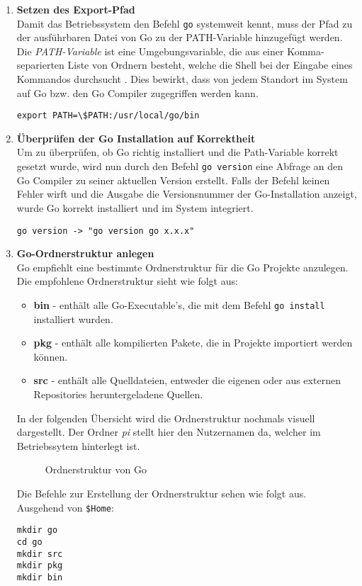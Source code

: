 \begin{enumerate}
\item \textbf{Setzen des Export-Pfad} \\
Damit das Betriebssystem den Befehl \verb|go| systemweit kennt, muss der Pfad zu der
ausführbaren Datei von Go zu der PATH-Variable hinzugefügt werden. Die
\textit{PATH-Variable} ist eine Umgebungsvariable, die aus einer
Komma-separierten Liste von Ordnern besteht, welche die Shell bei der Eingabe
eines Kommandos durchsucht \autocite{quigley_2000}. Dies bewirkt, dass von
jedem Standort im System auf Go bzw. den Go Compiler zugegriffen werden kann.
\begin{lstlisting}[caption={Setzen der Go-Path Variable}]
export PATH=\$PATH:/usr/local/go/bin
\end{lstlisting}

\item \textbf{Überprüfen der Go Installation auf Korrektheit} \\
Um zu überprüfen, ob Go richtig installiert und die Path-Variable
korrekt gesetzt wurde, wird nun durch den Befehl \verb|go version|
eine Abfrage an den Go Compiler zu seiner aktuellen Version erstellt. Falls der
Befehl keinen Fehler wirft und die Ausgabe die Versionsnummer der
Go-Installation anzeigt, wurde Go korrekt installiert und im System
integriert.
\begin{lstlisting}[caption={Go Version anzeigen}]
go version -> "go version go x.x.x"
\end{lstlisting}

\item \textbf{Go-Ordnerstruktur anlegen} \\
Go empfiehlt eine bestimmte Ordnerstruktur für die Go Projekte anzulegen.
Die empfohlene Ordnerstruktur sieht wie folgt aus:
\begin{itemize}
\item \textbf{bin} - enthält alle Go-Executable's, die mit dem Befehl \verb|go install| installiert wurden.
\item \textbf{pkg} - enthält alle kompilierten Pakete, die in Projekte importiert werden können. 
\item \textbf{src} - enthält alle Quelldateien, entweder die eigenen oder aus externen Repositories heruntergeladene Quellen.
\end{itemize}
In der folgenden Übersicht wird die Ordnerstruktur nochmals visuell
dargestellt. Der Ordner \textit{pi} stellt hier den Nutzernamen da, welcher im
Betriebssytem hinterlegt ist. \newline
\begin{minipage}[t]{\textwidth}
\begin{figure}[H]
\caption{Ordnerstruktur von Go} 
\end{figure}
Die Befehle zur Erstellung der Ordnerstruktur sehen wie folgt aus. \\
Ausgehend von \verb|$Home|:
\begin{lstlisting}[caption={Erstellung der Go Ordnerstruktur},label={lst:go_folder_structure}]
mkdir go
cd go
mkdir src
mkdir pkg
mkdir bin
\end{lstlisting}
\end{minipage}



\end{enumerate}
